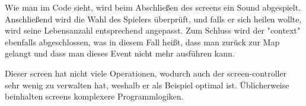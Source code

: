 Wie man im Code sieht, wird beim Abschließen des screens ein Sound abgespielt.
Anschließend wird die Wahl des Spielers überprüft, und falls er sich heilen wollte, wird seine Lebensanzahl entsprechend angepasst.
Zum Schluss wird der "context" ebenfalls abgeschlossen, was in diesem Fall heißt, dass man zurück zur Map gelangt und dass man dieses Event nicht mehr ausführen kann.

Dieser screen hat nicht viele Operationen, wodurch auch der screen-controller sehr wenig zu verwalten hat, weshalb er als Beispiel optimal ist.
Üblicherweise beinhalten screens komplexere Programmlogiken.